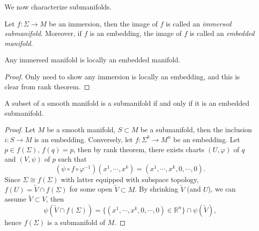 We now characterize submanifolds.
\begin{defn}
    Let $f:\Sigma\to M$ be an immersion, then the image of $f$ is called an \emph{immersed submanifold}.
    Moreover, if $f$ is an embedding, the image of $f$ is called an \emph{embedded manifold}.
\end{defn}

\begin{prop}
    Any immersed manifold is locally an embedded manifold.
\end{prop}
\begin{proof}
    Only need to show any immersion is locally an embedding, and this is clear from rank theorem.
\end{proof}

\begin{prop}
    A subset of a smooth manifold is a submanifold if and only if it is an embedded submanifold.
\end{prop}
\begin{proof}
    Let $M$ be a smooth manifold, $S\subset M$ be a submanifold, then the inclusion $i:S\to M$ is an embedding.
    Conversely, let $f:\Sigma^k\to M^n$ be an embedding.
    Let $p\in f(\Sigma)$, $f(q)=p$, then by rank theorem, there exists charts $(U,\varphi)$ of $q$ and $(V,\psi)$ of $p$ such that
    \[(\psi\circ f\circ\varphi^{-1})(x^1,\cdots,x^k)=(x^1,\cdots,x^k,0,\cdots,0).\]
    Since $\Sigma\cong f(\Sigma)$ with latter equipped with subspace topology, $f(U)=\tilde{V}\cap f(\Sigma)$ for some open $\tilde{V}\subset M$.
    By shrinking $\tilde{V}$ (and $U$), we can assume $\tilde{V}\subset V$, then
    \[\psi(\tilde{V}\cap f(\Sigma))=\{(x^1,\cdots,x^k,0,\cdots,0)\in\mathbb{R}^n\}\cap\psi(\tilde{V}),\]
    hence $f(\Sigma)$ is a submanifold of $M$.
\end{proof}

